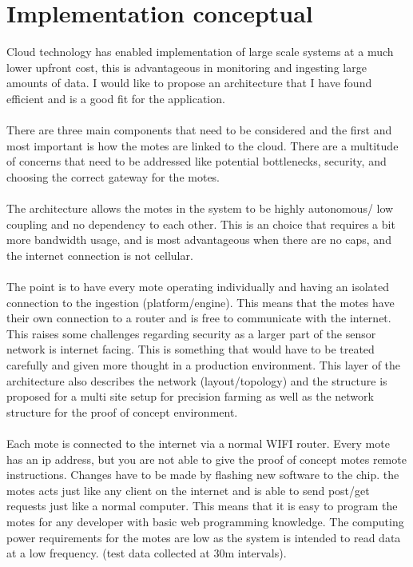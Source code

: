 \documentclass[]{uiophd}
\begin{document}
\section{Implementation conceptual}
Cloud technology has enabled implementation of large scale systems at a much lower upfront cost, this is advantageous in monitoring and ingesting large amounts of data. I would like to propose an architecture that I have found efficient and is a good fit for the application. 
\\\\
There are three main components that need to be considered and the first and most important is how the motes are linked to the cloud. There are a multitude of concerns that need to be addressed like potential bottlenecks, security, and choosing the correct gateway for the motes.
\\\\
The architecture allows the motes in the system to be highly autonomous/ low coupling and no dependency to each other. This is an choice that requires a bit more bandwidth usage, and is most advantageous when there are no caps, and the internet connection is not cellular.
\\\\
The point is to have every mote operating individually and having an isolated connection to the ingestion (platform/engine). This means that the motes have their own connection to a router and is free to communicate with the internet. This raises some challenges regarding security as a larger part of the sensor network is internet facing. This is something that would have to be treated carefully and given more thought in a production environment. This layer of the architecture also describes the network (layout/topology) and the structure is proposed for a multi site setup for precision farming as well as the network structure for the proof of concept environment.
\\\\
Each mote is connected to the internet via a normal WIFI router. Every mote has an ip address, but you are not able to give the proof of concept motes remote instructions. Changes have to be made by flashing new software to the chip. the motes acts just like any client on the internet and is able to send post/get requests just like a normal computer. This means that it is easy to program the motes for any developer with basic web programming knowledge. The computing power requirements for the motes are low as the system is intended to read data at a low frequency. (test data collected at 30m intervals).
\end{document}

